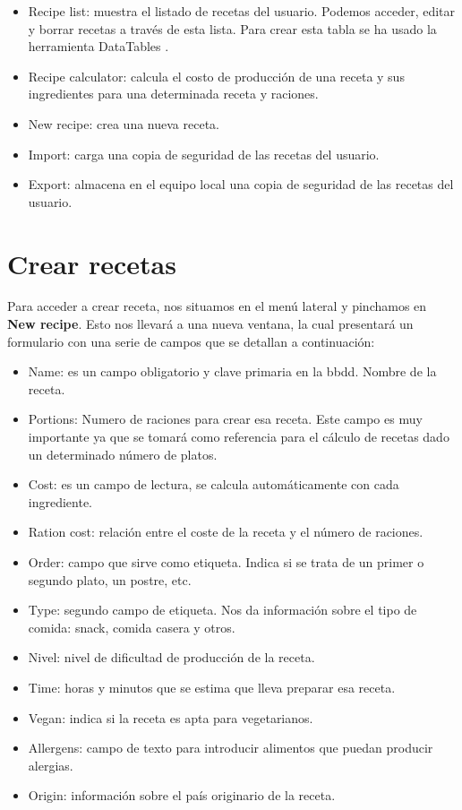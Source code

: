 \begin{itemize}
	\item Recipe list: muestra el listado de recetas del usuario. Podemos acceder, editar y borrar recetas a través de esta lista. Para crear esta tabla se ha usado la herramienta DataTables \cite{URL:Datatable}.
	\item Recipe calculator: calcula el costo de producción de una receta y sus ingredientes para una determinada receta y raciones.
	\item New recipe: crea una nueva receta.
	\item Import: carga una copia de seguridad de las recetas del usuario.
	\item Export: almacena en el equipo local una copia de seguridad de las recetas del usuario.
\end{itemize}


\vspace*{0.2in}
\section{Crear recetas}\label{cap.2.2}

Para acceder a crear receta, nos situamos en el menú lateral y pinchamos en \textbf{New recipe}. Esto nos llevará a una nueva ventana, la cual presentará un formulario con una serie de campos que se detallan a continuación:

\begin{itemize}
	\item Name: es un campo obligatorio y clave primaria en la bbdd. Nombre de la receta.
	\item Portions: Numero de raciones para crear esa receta. Este campo es muy importante ya que se tomará como referencia para el cálculo de recetas dado un determinado número de platos. %
	\item Cost: es un campo de lectura, se calcula automáticamente con cada ingrediente.
	\item Ration cost: relación entre el coste de la receta y el número de raciones.
	\item Order: campo que sirve como etiqueta. Indica si se trata de un primer o segundo plato, un postre, etc.
	\item Type: segundo campo de etiqueta. Nos da información sobre el tipo de comida: snack, comida casera y otros.
	\item Nivel: nivel de dificultad de producción de la receta.
	\item Time: horas y minutos que se estima que lleva preparar esa receta.
	\item Vegan: indica si la receta es apta para vegetarianos.
	\item Allergens: campo de texto para introducir alimentos que puedan producir alergias.
	\item Origin: información sobre el país originario de la receta.
\end{itemize}

